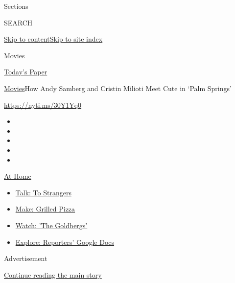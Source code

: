 Sections

SEARCH

\protect\hyperlink{site-content}{Skip to
content}\protect\hyperlink{site-index}{Skip to site index}

\href{https://www.nytimes.com/section/movies}{Movies}

\href{https://myaccount.nytimes.com/auth/login?response_type=cookie\&client_id=vi}{}

\href{https://www.nytimes.com/section/todayspaper}{Today's Paper}

\href{/section/movies}{Movies}\textbar{}How Andy Samberg and Cristin
Milioti Meet Cute in `Palm Springs'

\url{https://nyti.ms/30Y1Yq0}

\begin{itemize}
\item
\item
\item
\item
\item
\end{itemize}

\href{https://www.nytimes.com/spotlight/at-home?action=click\&pgtype=Article\&state=default\&region=TOP_BANNER\&context=at_home_menu}{At
Home}

\begin{itemize}
\tightlist
\item
  \href{https://www.nytimes.com/2020/08/03/well/family/the-benefits-of-talking-to-strangers.html?action=click\&pgtype=Article\&state=default\&region=TOP_BANNER\&context=at_home_menu}{Talk:
  To Strangers}
\item
  \href{https://www.nytimes.com/2020/08/01/at-home/coronavirus-make-pizza-on-a-grill.html?action=click\&pgtype=Article\&state=default\&region=TOP_BANNER\&context=at_home_menu}{Make:
  Grilled Pizza}
\item
  \href{https://www.nytimes.com/2020/07/31/arts/television/goldbergs-abc-stream.html?action=click\&pgtype=Article\&state=default\&region=TOP_BANNER\&context=at_home_menu}{Watch:
  'The Goldbergs'}
\item
  \href{https://www.nytimes.com/interactive/2020/at-home/even-more-reporters-editors-diaries-lists-recommendations.html?action=click\&pgtype=Article\&state=default\&region=TOP_BANNER\&context=at_home_menu}{Explore:
  Reporters' Google Docs}
\end{itemize}

Advertisement

\protect\hyperlink{after-top}{Continue reading the main story}

